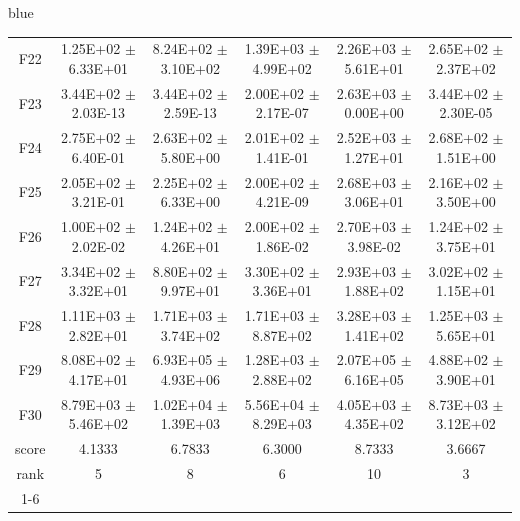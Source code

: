 \documentclass[journal, onecolumn]{IEEEtran}
\begin{document}
\begin{color}{blue}
\begin{table}[htbp!]
\begin{tabular}{c|ccccc}
		F22	 &	1.25E+02	$\pm$	6.33E+01		 &	8.24E+02	$\pm$	3.10E+02		 &	1.39E+03	$\pm$	4.99E+02		 &	2.26E+03	$\pm$	5.61E+01		 &	2.65E+02	$\pm$	2.37E+02	\\	
		F23	 &	3.44E+02	$\pm$	2.03E-13		 &	3.44E+02	$\pm$	2.59E-13		 &	2.00E+02	$\pm$	2.17E-07		 &	2.63E+03	$\pm$	0.00E+00		 &	3.44E+02	$\pm$	2.30E-05	\\	
		F24	 &	2.75E+02	$\pm$	6.40E-01		 &	2.63E+02	$\pm$	5.80E+00		 &	2.01E+02	$\pm$	1.41E-01		 &	2.52E+03	$\pm$	1.27E+01		 &	2.68E+02	$\pm$	1.51E+00	\\	
		F25	 &	2.05E+02	$\pm$	3.21E-01		 &	2.25E+02	$\pm$	6.33E+00		 &	2.00E+02	$\pm$	4.21E-09		 &	2.68E+03	$\pm$	3.06E+01		 &	2.16E+02	$\pm$	3.50E+00	\\	
		F26	 &	1.00E+02	$\pm$	2.02E-02		 &	1.24E+02	$\pm$	4.26E+01		 &	2.00E+02	$\pm$	1.86E-02		 &	2.70E+03	$\pm$	3.98E-02		 &	1.24E+02	$\pm$	3.75E+01	\\	
		F27	 &	3.34E+02	$\pm$	3.32E+01		 &	8.80E+02	$\pm$	9.97E+01		 &	3.30E+02	$\pm$	3.36E+01		 &	2.93E+03	$\pm$	1.88E+02		 &	3.02E+02	$\pm$	1.15E+01	\\	
		F28	 &	1.11E+03	$\pm$	2.82E+01		 &	1.71E+03	$\pm$	3.74E+02		 &	1.71E+03	$\pm$	8.87E+02		 &	3.28E+03	$\pm$	1.41E+02		 &	1.25E+03	$\pm$	5.65E+01	\\	
		F29	 &	8.08E+02	$\pm$	4.17E+01		 &	6.93E+05	$\pm$	4.93E+06		 &	1.28E+03	$\pm$	2.88E+02		 &	2.07E+05	$\pm$	6.16E+05		 &	4.88E+02	$\pm$	3.90E+01	\\	
		F30	 &	8.79E+03	$\pm$	5.46E+02		 &	1.02E+04	$\pm$	1.39E+03		 &	5.56E+04	$\pm$	8.29E+03		 &	4.05E+03	$\pm$	4.35E+02		 &	8.73E+03	$\pm$	3.12E+02	\\	\hline
		score	 	& 4.1333 & 6.7833 & 6.3000 & 8.7333 & 3.6667											\\													
		rank 		& 5 & 8 & 6 & 10 & 3											\\	\cline{1-6}												
		
		\end{tabular}
	\end{table}


\end{color}
\end{document}
